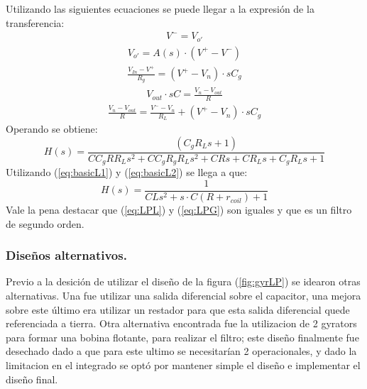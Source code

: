 Utilizando las siguientes ecuaciones se puede llegar a la expresión de la transferencia:
\begin{align}V^- = V_{o'}\end{align}
\begin{align}V_{o'} = A(s)\cdot (V^+-V^-)\end{align}
\begin{align}\frac{V_{In}-V^+}{R_g}=(V^+-V_n)\cdot s C_g\end{align}
\begin{align}V_{out}\cdot s C=\frac{V_{n}-V_{out}}{R}\end{align}
\begin{align}\frac{V_{n}-V_{out}}{R}=\frac{V^--V_n}{R_L} +(V^+-V_n)\cdot s C_g\end{align}
Operando se obtiene:
\begin{equation} H(s)= \frac{\left(C_g R_L s + 1\right)}{C C_g R R_L s^{2} + C C_g R_g R_L s^{2} + C R s + C R_L s + C_g R_L s + 1}
\end{equation}
Utilizando (\ref{eq:basicL1}) y (\ref{eq:basicL2}) se llega a que:
\begin{equation} H(s)= \frac{1}{C L s^{2} + s\cdot C (R+r_{coil}) + 1}
\label{eq:LPG}
\end{equation}
Vale la pena destacar que (\ref{eq:LPL}) y (\ref{eq:LPG}) son iguales y que es un filtro de segundo orden.
\subsubsection{Diseños alternativos.}
Previo a la desición de utilizar el diseño de la figura (\ref{fig:gyrLP}) se idearon otras alternativas. Una fue utilizar una salida diferencial sobre el capacitor, una mejora sobre este último era utilizar un restador para que esta salida diferencial quede referenciada a tierra. Otra alternativa encontrada fue la utilizacion de 2 gyrators para formar una bobina flotante, para realizar el filtro; este diseño finalmente fue desechado dado a que para este ultimo se necesitarían 2 operacionales, y dado la limitacion en el integrado se optó por mantener simple el diseño e implementar el diseño final.
